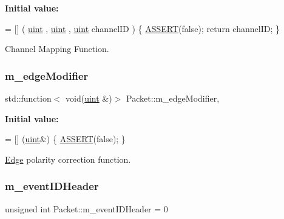 {\bfseries Initial value\+:}
\begin{DoxyCode}
= [] (
    \hyperlink{_channel_mappings_8cpp_a69aa29b598b851b0640aa225a9e5d61d}{uint} ,
    \hyperlink{_channel_mappings_8cpp_a69aa29b598b851b0640aa225a9e5d61d}{uint} ,
    \hyperlink{_channel_mappings_8cpp_a69aa29b598b851b0640aa225a9e5d61d}{uint} channelID
) \{
    \hyperlink{_debug_8hpp_aca68c0d4ac8df0838e209fb5300f7be3}{ASSERT}(\textcolor{keyword}{false}); 
    \textcolor{keywordflow}{return} channelID;
\}
\end{DoxyCode}


Channel Mapping Function. 

\mbox{\label{class_packet_aa95ed5326667f67a5c2d101cd5a4afca}} 
\subsubsection{\texorpdfstring{m\+\_\+edge\+Modifier}{m\_edgeModifier}}
{\footnotesize\ttfamily std\+::function$<$ void(\hyperlink{_channel_mappings_8cpp_a69aa29b598b851b0640aa225a9e5d61d}{uint} \&)$>$ Packet\+::m\+\_\+edge\+Modifier\hspace{0.3cm}{\ttfamily [static]}, {\ttfamily [private]}}

{\bfseries Initial value\+:}
\begin{DoxyCode}
= [] (\hyperlink{_channel_mappings_8cpp_a69aa29b598b851b0640aa225a9e5d61d}{uint}&) \{
    \hyperlink{_debug_8hpp_aca68c0d4ac8df0838e209fb5300f7be3}{ASSERT}(\textcolor{keyword}{false}); 
\}
\end{DoxyCode}


\hyperlink{class_edge}{Edge} polarity correction function. 

\mbox{\label{class_packet_a3abf93570be0669506f39b391bc574ca}} 
\subsubsection{\texorpdfstring{m\+\_\+event\+I\+D\+Header}{m\_eventIDHeader}}
{\footnotesize\ttfamily unsigned int Packet\+::m\+\_\+event\+I\+D\+Header = 0\hspace{0.3cm}{\ttfamily [private]}}



